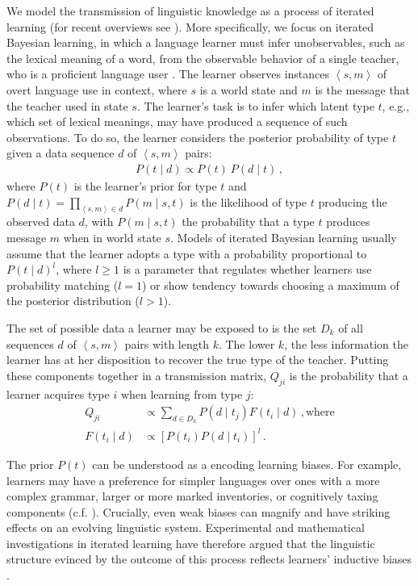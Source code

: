 \documentclass[10pt,a4paper]{article}
\newcommand{\tuple}[1]{\ensuremath{\left\langle #1 \right\rangle}}
\begin{document}
We model the transmission of linguistic knowledge as a process of iterated learning (for recent
overviews see \citealt{kirby+etal:2014, tamariz+kirby:2016}). More specifically, we focus on
iterated Bayesian learning, in which a language learner must infer unobservables, such as the
lexical meaning of a word, from the observable behavior of a single teacher, who is a
proficient language user \citep[e.g.][]{griffiths+kalish:2007,kirby+etal:2007}. The learner
observes instances $\tuple{s,m}$ of overt language use in context, where $s$ is a world state
and $m$ is the message that the teacher used in state $s$. The learner's task is to infer which
latent type $t$, e.g., which set of lexical meanings, may have produced a sequence of such
observations. To do so, the learner considers the posterior probability of type $t$ given a
data sequence $d$ of $\tuple{s, m}$ pairs:
\begin{align*}
  P(t \mid d) \propto P(t) \ P(d \mid t)\,,
\end{align*}
where $P(t)$ is the learner's prior for type $t$ and
$P(d \mid t) = \prod_{\tuple{s,m} \in d} P(m \mid s, t)$ is the likelihood of type $t$
producing the observed data $d$, with $P(m \mid s, t)$ the probability that a type $t$ produces
message $m$ when in world state $s$. Models of iterated Bayesian learning usually assume that
the learner adopts a type with a probability proportional to $P(t \mid d)^l$, where $l \ge 1$
is a parameter that regulates whether learners use probability matching ($l = 1$) or show
tendency towards choosing a maximum of the posterior distribution ($l > 1$). 

The set of possible data a learner may be exposed to is the set $D_k$ of all sequences $d$  of $\tuple{s,m}$ pairs with
length $k$. The lower $k$, the less information the learner has at her disposition to
recover the true type of the teacher. Putting these components together in a transmission matrix, $Q_{ji}$ is the probability that a learner acquires type $i$ when learning from type $j$:
\begin{align*}
  Q_{ji} &\propto \sum_{d \in D_k} P(d \mid t_j) F(t_i \mid d)\,, \text{where} \\
  F(t_i \mid d) &\propto [P(t_i) P(d \mid t_i)]^l\,.
\end{align*}


The prior $P(t)$ can be understood as a encoding learning biases. For example, learners may
have a preference for simpler languages over ones with a more complex grammar, larger or more
marked inventories, or cognitively taxing components
(c.f. \citealt{feldman:2000,chater+vitanyi:2003, kirby+etal:2015}). Crucially, even weak biases
can magnify and have striking effects on an evolving linguistic system. Experimental and
mathematical investigations in iterated learning have therefore argued that the linguistic
structure evinced by the outcome of this process reflects learners' inductive biases
\citep{kirby+etal:2007,kirby+etal:2014}. 
\end{document}
